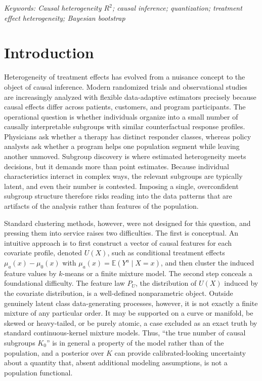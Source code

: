 \documentclass[11pt]{article}
\newcommand{\E}{\mathbb E}
\begin{document}
\noindent%
{\it Keywords: Causal heterogeneity $R^2$; causal inference; quantization; treatment effect heterogeneity; Bayesian bootstrap}


{} %


\section{Introduction}
\label{sec:intro}


Heterogeneity of treatment effects has evolved from a nuisance concept to the object of causal inference. Modern randomized trials and observational studies are increasingly analyzed with flexible data-adaptive estimators precisely because causal effects differ across patients, customers, and program participants. The operational question is whether individuals organize into a small number of causally interpretable subgroups with similar counterfactual response profiles. Physicians ask whether a therapy has distinct responder classes, whereas policy analysts ask whether a program helps one population segment while leaving another unmoved. Subgroup discovery is where estimated heterogeneity meets decisions, but it demands more than point estimates. Because individual characteristics interact in complex ways, the relevant subgroups are typically latent, and even their number is contested. Imposing a single, overconfident subgroup structure therefore risks reading into the data patterns that are artifacts of the analysis rather than features of the population.



Standard clustering methods, however, were not designed for this question, and pressing them into service raises two difficulties. The first is conceptual. An intuitive approach is to first construct a vector of causal features for each covariate profile, denoted $U(X)$, such as conditional treatment effects $\mu_a(x)-\mu_0(x)$ with $\mu_a(x)=\E(Y^a\mid X=x)$, and then cluster the induced feature values by $k$-means or a finite mixture model. The second step conceals a foundational difficulty. The feature law $P_U$, the distribution of $U(X)$ induced by the covariate distribution, is a well-defined nonparametric object. Outside genuinely latent class data-generating processes, however, it is not exactly a finite mixture of any particular order. It may be supported on a curve or manifold, be skewed or heavy-tailed, or be purely atomic, a case excluded as an exact truth by standard continuous-kernel mixture models. Thus, ``the true number of causal subgroups $K_0$'' is in general a property of the model rather than of the population, and a posterior over $K$ can provide calibrated-looking uncertainty about a quantity that, absent additional modeling assumptions, is not a population functional.
\end{document}
